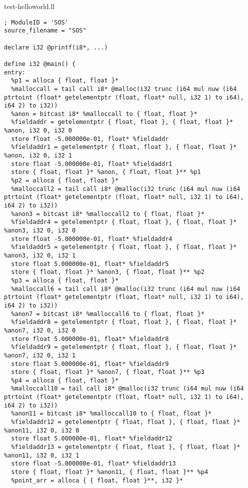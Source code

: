 \documentclass[main.tex]{subfiles}
\begin{document}
{\tiny
\colorbox{green!30}{test-helloworld.ll}
\begin{lstlisting}
; ModuleID = 'SOS'
source_filename = "SOS"

declare i32 @printf(i8*, ...)

define i32 @main() {
entry:
  %p1 = alloca { float, float }*
  %malloccall = tail call i8* @malloc(i32 trunc (i64 mul nuw (i64 ptrtoint (float* getelementptr (float, float* null, i32 1) to i64), i64 2) to i32))
  %anon = bitcast i8* %malloccall to { float, float }*
  %fieldaddr = getelementptr { float, float }, { float, float }* %anon, i32 0, i32 0
  store float -5.000000e-01, float* %fieldaddr
  %fieldaddr1 = getelementptr { float, float }, { float, float }* %anon, i32 0, i32 1
  store float -5.000000e-01, float* %fieldaddr1
  store { float, float }* %anon, { float, float }** %p1
  %p2 = alloca { float, float }*
  %malloccall2 = tail call i8* @malloc(i32 trunc (i64 mul nuw (i64 ptrtoint (float* getelementptr (float, float* null, i32 1) to i64), i64 2) to i32))
  %anon3 = bitcast i8* %malloccall2 to { float, float }*
  %fieldaddr4 = getelementptr { float, float }, { float, float }* %anon3, i32 0, i32 0
  store float -5.000000e-01, float* %fieldaddr4
  %fieldaddr5 = getelementptr { float, float }, { float, float }* %anon3, i32 0, i32 1
  store float 5.000000e-01, float* %fieldaddr5
  store { float, float }* %anon3, { float, float }** %p2
  %p3 = alloca { float, float }*
  %malloccall6 = tail call i8* @malloc(i32 trunc (i64 mul nuw (i64 ptrtoint (float* getelementptr (float, float* null, i32 1) to i64), i64 2) to i32))
  %anon7 = bitcast i8* %malloccall6 to { float, float }*
  %fieldaddr8 = getelementptr { float, float }, { float, float }* %anon7, i32 0, i32 0
  store float 5.000000e-01, float* %fieldaddr8
  %fieldaddr9 = getelementptr { float, float }, { float, float }* %anon7, i32 0, i32 1
  store float 5.000000e-01, float* %fieldaddr9
  store { float, float }* %anon7, { float, float }** %p3
  %p4 = alloca { float, float }*
  %malloccall10 = tail call i8* @malloc(i32 trunc (i64 mul nuw (i64 ptrtoint (float* getelementptr (float, float* null, i32 1) to i64), i64 2) to i32))
  %anon11 = bitcast i8* %malloccall10 to { float, float }*
  %fieldaddr12 = getelementptr { float, float }, { float, float }* %anon11, i32 0, i32 0
  store float 5.000000e-01, float* %fieldaddr12
  %fieldaddr13 = getelementptr { float, float }, { float, float }* %anon11, i32 0, i32 1
  store float -5.000000e-01, float* %fieldaddr13
  store { float, float }* %anon11, { float, float }** %p4
  %point_arr = alloca { { float, float }**, i32 }*

\end{lstlisting}}
\end{document}
